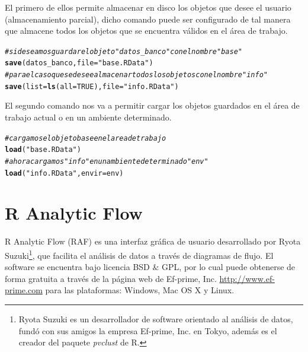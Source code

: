\documentclass[11pt,a4paper,oneside]{book}\usepackage[]{graphicx}\usepackage[]{color}
\makeatletter
\newcommand{\hlnum}[1]{\textcolor[rgb]{0.686,0.059,0.569}{#1}}%
\newcommand{\hlstr}[1]{\textcolor[rgb]{0.192,0.494,0.8}{#1}}%
\newcommand{\hlcom}[1]{\textcolor[rgb]{0.678,0.584,0.686}{\textit{#1}}}%
\newcommand{\hlstd}[1]{\textcolor[rgb]{0.345,0.345,0.345}{#1}}%
\newcommand{\hlkwc}[1]{\textcolor[rgb]{0.333,0.667,0.333}{#1}}%
\newcommand{\hlkwd}[1]{\textcolor[rgb]{0.737,0.353,0.396}{\textbf{#1}}}%
\newenvironment{kframe}{%
 \def\at@end@of@kframe{}%
 \ifinner\ifhmode%
  \def\at@end@of@kframe{\end{minipage}}%
  \begin{minipage}{\columnwidth}%
 \fi\fi%
 \def\FrameCommand##1{\hskip\@totalleftmargin \hskip-\fboxsep
 \colorbox{shadecolor}{##1}\hskip-\fboxsep
     \hskip-\linewidth \hskip-\@totalleftmargin \hskip\columnwidth}%
 \MakeFramed {\advance\hsize-\width
   \@totalleftmargin\z@ \linewidth\hsize
   \@setminipage}}%
 {\par\unskip\endMakeFramed%
 \at@end@of@kframe}
\newenvironment{knitrout}{}{} %
\makeatother
\begin{document}
\begin{itemize}
El primero de ellos permite almacenar en disco los objetos que desee el usuario (almacenamiento parcial), dicho comando puede ser configurado de tal manera que almacene todos los objetos que se encuentra válidos en el área de trabajo.
\begin{knitrout}
\color{fgcolor}\begin{kframe}
\begin{alltt}
\hlcom{# si deseamos guardar el objeto "datos_banco" con el nombre "base" }
\hlkwd{save}\hlstd{(datos_banco,} \hlkwc{file} \hlstd{=} \hlstr{"base.RData"}\hlstd{)}
\hlcom{# para el caso que se desee almacenar todos los objetos con el nombre "info"}
\hlkwd{save}\hlstd{(}\hlkwc{list} \hlstd{=} \hlkwd{ls}\hlstd{(}\hlkwc{all} \hlstd{=} \hlnum{TRUE}\hlstd{),} \hlkwc{file} \hlstd{=} \hlstr{"info.RData"}\hlstd{)}
\end{alltt}
\end{kframe}
\end{knitrout}

El segundo comando nos va a permitir cargar los objetos guardados en el área de trabajo actual o en un ambiente determinado.
\begin{knitrout}
\color{fgcolor}\begin{kframe}
\begin{alltt}
\hlcom{# cargamos el objeto base en el area de trabajo}
\hlkwd{load}\hlstd{(}\hlstr{"base.RData"}\hlstd{)}
\hlcom{# ahora cargamos "info" en un ambiente determinado "env"}
\hlkwd{load}\hlstd{(}\hlstr{"info.RData"}\hlstd{,} \hlkwc{envir} \hlstd{= env)}
\end{alltt}
\end{kframe}
\end{knitrout}

\section{R Analytic Flow}

R Analytic Flow (RAF) es una interfaz gráfica de usuario desarrollado por Ryota Suzuki\footnote{Ryota Suzuki es un desarrollador de software orientado al análisis de datos, fundó con sus amigos la empresa Ef-prime, Inc. en Tokyo, además es el creador del paquete \emph{pvclust} de R.}, que facilita el análisis de datos a través de diagramas de flujo. El software se encuentra bajo licencia BSD $\&$ GPL, por lo cual puede obtenerse de forma gratuita a través de la página web de Ef-prime, Inc. \url{http://www.ef-prime.com} para las plataformas: Windows, Mac OS X y Linux.


\end{itemize}
\end{document}
